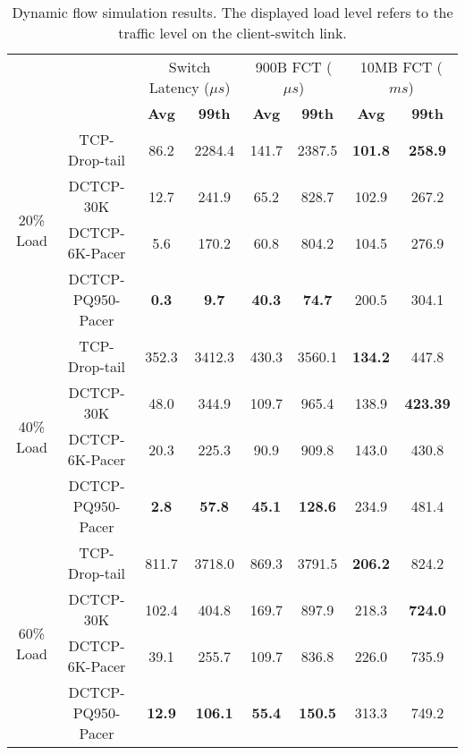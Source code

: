\documentclass[10pt,conference,compsocconf]{IEEEtran}
\begin{document}
\begin{table*}[t]
    \centering
    \begin{tabular}{c c|c  c|c c|c c|}
        \cline{3-8}
        & & \multicolumn{2}{|c|}{Switch Latency ($\mu s$)} & \multicolumn{2}{|c|}{900B FCT ($\mu s$)} & \multicolumn{2}{|c|}{10MB FCT ($ms$)} \\
        \cline{3-8} 
        & & \textbf{Avg} & \textbf{99th} & \textbf{Avg} & \textbf{99th} & \textbf{Avg} & \textbf{99th}\\
        \hline

        \multirow{4}{*}{20\% Load}  
            & TCP-Drop-tail      & 86.2 & 2284.4 & 141.7 & 2387.5 & \textbf{101.8} & \textbf{258.9}\\
            & DCTCP-30K         & 12.7 & 241.9 & 65.2 & 828.7 & 102.9 & 267.2\\
            & DCTCP-6K-Pacer    & 5.6 & 170.2 & 60.8 & 804.2 & 104.5 & 276.9\\
            & DCTCP-PQ950-Pacer & \textbf{0.3} & \textbf{9.7} & \textbf{40.3} & \textbf{74.7} & 200.5 & 304.1\\
        \hline
        \multirow{4}{*}{40\% Load}  
            & TCP-Drop-tail      & 352.3 & 3412.3 & 430.3 & 3560.1 & \textbf{134.2} & 447.8\\
            & DCTCP-30K         & 48.0 & 344.9 & 109.7 & 965.4 & 138.9 & \textbf{423.39}\\
            & DCTCP-6K-Pacer    & 20.3 & 225.3 & 90.9 & 909.8 & 143.0 & 430.8\\
            & DCTCP-PQ950-Pacer & \textbf{2.8} & \textbf{57.8} & \textbf{45.1} & \textbf{128.6} & 234.9 & 481.4\\
        \hline
        \multirow{4}{*}{60\% Load}  
            & TCP-Drop-tail      & 811.7 & 3718.0 & 869.3 & 3791.5 & \textbf{206.2} & 824.2\\
            & DCTCP-30K         & 102.4 & 404.8 & 169.7 & 897.9 & 218.3 & \textbf{724.0}\\
            & DCTCP-6K-Pacer    & 39.1 & 255.7 & 109.7 & 836.8 & 226.0 & 735.9\\
            & DCTCP-PQ950-Pacer & \textbf{12.9} & \textbf{106.1} & \textbf{55.4} & \textbf{150.5} & 313.3 & 749.2\\
        \hline
        
        
    \end{tabular}
\caption{Dynamic flow simulation results. The displayed load level refers to the traffic level on the client-switch link.}
\label{tab:dynamic}
\end{table*}
\end{document}
